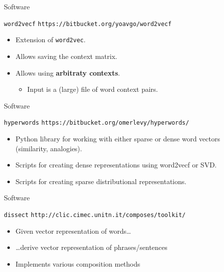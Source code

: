 \documentclass[compress]{beamer}
\begin{document}
\begin{frame}{Software}

    \begin{block}{\texttt{word2vecf}}
        \texttt{https://bitbucket.org/yoavgo/word2vecf}
    \begin{itemize}
        \item Extension of \texttt{word2vec}.
        \item Allows saving the context matrix.
        \item Allows using \textbf{arbitraty contexts}.
            \begin{itemize}
                \item Input is a (large) file of word context pairs.
            \end{itemize}
    \end{itemize}
    \end{block}
\end{frame}

\begin{frame}{Software}

    \begin{block}{\texttt{hyperwords}}
        \texttt{https://bitbucket.org/omerlevy/hyperwords/}
    \begin{itemize}
        \item Python library for working with either sparse or dense word vectors (similarity, analogies).
        \item Scripts for creating dense representations using word2vecf or SVD.
        \item Scripts for creating sparse distributional representations.
    \end{itemize}
    \end{block}

\end{frame}


\begin{frame}{Software}
    \begin{block}{\texttt{dissect}}
        \texttt{http://clic.cimec.unitn.it/composes/toolkit/}
    \begin{itemize}
        \item Given vector representation of words\ldots
        \item \ldots derive vector representation of phrases/sentences
        \item Implements various composition methods
    \end{itemize}
    \end{block}
\end{frame}
\end{document}
